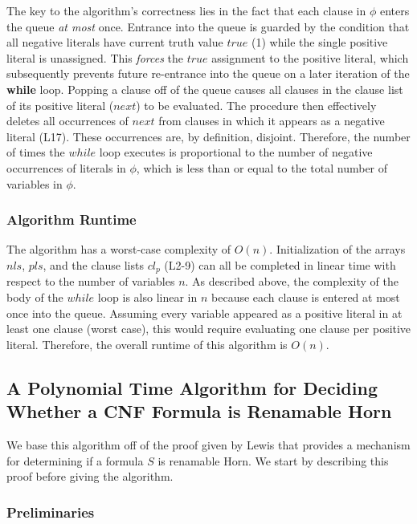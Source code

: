 \documentclass{article}
\begin{document}
\noindent The key to the algorithm's correctness lies in the fact that each clause in $\phi$ enters the queue \emph{at most} once. Entrance into the queue is guarded by the condition that all negative literals have current truth value $true$ (1) while the single positive literal is unassigned. This \emph{forces} the $true$ assignment to the positive literal, which subsequently prevents future re-entrance into the queue on a later iteration of the \textbf{while} loop. Popping a clause off of the queue causes all clauses in the clause list of its positive literal ($next$) to be evaluated. The procedure then effectively deletes all occurrences of $next$ from clauses in which it appears as a negative literal (L17). These occurrences are, by definition, disjoint. Therefore, the number of times the $while$ loop executes is proportional to the number of negative occurrences of literals in $\phi$, which is less than or equal to the total number of variables in $\phi$.

\subsubsection{Algorithm Runtime}

\noindent The algorithm has a worst-case complexity of $O(n)$. Initialization of the arrays $nls$, $pls$, and the clause lists $cl_p$ (L2-9) can all be completed in linear time with respect to the number of variables $n$. As described above, the complexity of the body of the $while$ loop is also linear in $n$ because each clause is entered at most once into the queue. Assuming every variable appeared as a positive literal in at least one clause (worst case), this would require evaluating one clause per positive literal. Therefore, the overall runtime of this algorithm is $O(n)$.

\subsection{A Polynomial Time Algorithm for Deciding Whether a CNF Formula is Renamable Horn}

We base this algorithm off of the proof given by Lewis \cite{lewis_1978} that provides a mechanism for determining if a formula $S$ is renamable Horn. We start by describing this proof before giving the algorithm.

\medskip
\subsubsection{Preliminaries}
\end{document}
